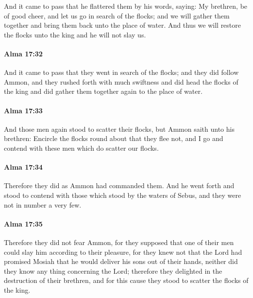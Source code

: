 			And it came to pass that he flattered them by his words, saying:
			My brethren, be of good cheer,
			and let us go in search of the flocks;
			and we will gather them together
			and bring them back unto the place of water.
			And thus we will restore the flocks unto the king
			and he will not slay us.

		\paragraph{Alma 17:32} %
			\label{ALMA-17-32}

			And it came to pass that they went in search of the flocks;
			and they did follow Ammon,
			and they rushed forth with much swiftness
			and did head the flocks of the king
			and did gather them together again to the place of water.

		\paragraph{Alma 17:33} %
			\label{ALMA-17-33}

			And those men again stood to scatter their flocks,
			but Ammon saith unto his brethren:
			Encircle the flocks round about that they flee not,
			and I go and contend with these men which do scatter our flocks.

		\paragraph{Alma 17:34} %
			\label{ALMA-17-34}

			Therefore they did as Ammon had commanded them.
			And he went forth and stood to contend with those
			which stood by the waters of Sebus,
			and they were not in number a very few.

		\paragraph{Alma 17:35} %
			\label{ALMA-17-35}

			Therefore they did not fear Ammon,
			for they supposed that one of their men could slay him
			according to their pleasure,
			for they knew not that the Lord had promised Mosiah
			that he would deliver his sons out of their hands,
			neither did they know any thing concerning the Lord;
			therefore they delighted in the destruction of their brethren,
			and for this cause they stood to scatter the flocks of the king.

